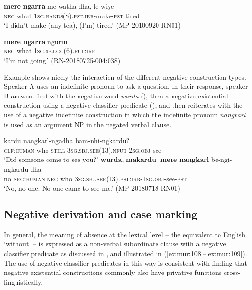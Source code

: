 \documentclass[output=paper,colorlinks,citecolor=brown]{langscibook}
\begin{document}
\ea\label{ex:mur:105} 
    \gll \textbf{mere} \textbf{ngarra} me-watha-dha, {le wiye}\\
         \textsc{neg} what \textsc{1sg.hands(8).pst:irr-}make\textsc{{}-pst} tired\\
    \glt ‘I didn’t make (any tea), (I’m) tired.’ (MP-20100920-RN01)
\z 

\ea\label{ex:mur:106}
    \gll \textbf{mere} \textbf{ngarra} ngurru\\
          \textsc{neg} what \textsc{1sg.sbj.go(6).fut:irr}\\
    \glt ‘I’m not going.’ (RN-20180725-004:038)
\z 
         
Example  shows nicely the interaction of the different negative construction types. Speaker A uses an indefinite pronoun to ask a question. In their response, speaker B answers first with the negative word \textit{wurda} (), then a negative existential construction using a negative classifier predicate (), and then reiterates with the use of a negative indefinite construction in which the indefinite pronoun \textit{nangkarl} is used as an argument NP in the negated verbal clause.

\ea\label{ex:mur:107}
    \begin{xlist}[Q: ]
    \label{ex:mur:107A}
        \gll  kardu nangkarl-ngadha bam-nhi-ngkardu?\\ 
              \textsc{clf:human} who{}-\textsc{still} \textsc{3sg.sbj.see(13).nfut-2sg.obj-}see\\ 
        \glt ‘Did someone come to see you?’
    \label{ex:mur:107B}
        \gll  \textbf{wurda}, \textbf{makardu}. \textbf{mere} \textbf{nangkarl} be-ngi-ngkardu-dha\\ 
               no \textsc{neg:human} \textsc{neg} who \textsc{3sg.sbj.see(13).pst:irr-1sg.obj-}see-\textsc{pst}\\
        \glt ‘No, no-one. No-one came to see me.’ (MP-20180718-RN01)
    \end{xlist}
\z 

\subsection{Negative derivation and case marking} \label{sec:mur:3.3}

In general, the meaning of absence at the lexical level – the equivalent to English ‘without’ – is expressed as a non-verbal subordinate clause with a negative classifier predicate as discussed in ,  and illustrated in (\ref{ex:mur:108}--\ref{ex:mur:109}). The use of negative classifier predicates in this way is consistent with  finding that negative existential constructions commonly also have privative functions cross-linguistically.
\end{document}
